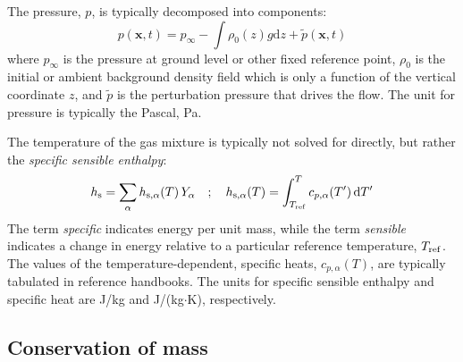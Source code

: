 \documentclass[graybox]{svmult}
\begin{document}
The pressure, $p$, is typically decomposed into components:
\begin{equation}
   p(\mathbf{x},t) = p_\infty - \int \rho_0(z) g \mbox{d}z + \tilde{p}(\mathbf{x},t)
\end{equation}
where $p_\infty$ is the pressure at ground level or other fixed reference point, $\rho_0$ is the initial or ambient background density field which is only a function of the vertical coordinate $z$, and $\tilde{p}$ is the perturbation pressure that drives the flow. The unit for pressure is typically the Pascal, Pa.

The temperature of the gas mixture is typically not solved for directly, but rather the {\em specific sensible enthalpy}:
\begin{equation}
  h_{\rm s} = \sum_\alpha h_{{\rm s},\alpha}(T) \, Y_\alpha \quad ; \quad h_{{\rm s},\alpha}(T) = \int_{T_{\rm ref}}^T c_{p,\alpha}(T') \, \mbox{d}T'
\end{equation}
The term {\em specific} indicates energy per unit mass, while the term {\em sensible} indicates a change in energy relative to a particular reference temperature, $T_{\rm ref}$. The values of the temperature-dependent, specific heats, $c_{p,\alpha}(T)$, are typically tabulated in reference handbooks. The units for specific sensible enthalpy and specific heat are J/kg and J/(kg$\cdot$K), respectively.



\subsection{Conservation of mass}
\end{document}
